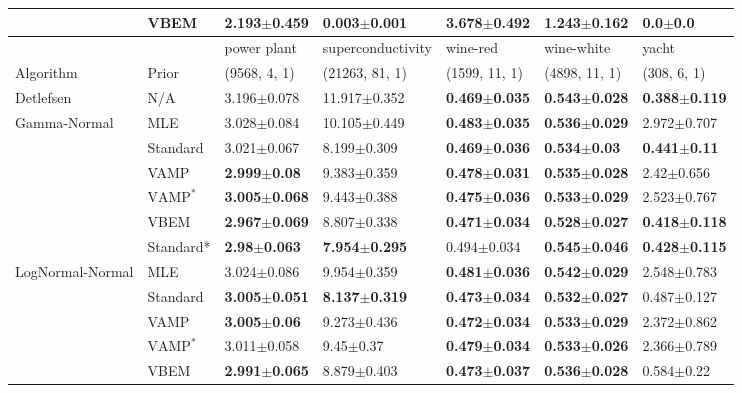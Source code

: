 \begin{tabular}{lllllll}
                 & VBEM &  \textbf{2.193$\pm$0.459} &  \textbf{0.003$\pm$0.001} &           3.678$\pm$0.492 &           1.243$\pm$0.162 &           0.0$\pm$0.0 \\
\midrule
                 &      &               power plant &         superconductivity &                  wine-red &                wine-white &                     yacht \\
Algorithm & Prior& (9568, 4, 1)& (21263, 81, 1)& (1599, 11, 1)& (4898, 11, 1)& (308, 6, 1)\\
\midrule
Detlefsen & N/A &           3.196$\pm$0.078 &          11.917$\pm$0.352 &  \textbf{0.469$\pm$0.035} &  \textbf{0.543$\pm$0.028} &  \textbf{0.388$\pm$0.119} \\
Gamma-Normal & MLE &           3.028$\pm$0.084 &          10.105$\pm$0.449 &  \textbf{0.483$\pm$0.035} &  \textbf{0.536$\pm$0.029} &           2.972$\pm$0.707 \\
                 & Standard &           3.021$\pm$0.067 &           8.199$\pm$0.309 &  \textbf{0.469$\pm$0.036} &   \textbf{0.534$\pm$0.03} &   \textbf{0.441$\pm$0.11} \\
                 & VAMP &   \textbf{2.999$\pm$0.08} &           9.383$\pm$0.359 &  \textbf{0.478$\pm$0.031} &  \textbf{0.535$\pm$0.028} &            2.42$\pm$0.656 \\
                 & $\text{VAMP}^*$ &  \textbf{3.005$\pm$0.068} &           9.443$\pm$0.388 &  \textbf{0.475$\pm$0.036} &  \textbf{0.533$\pm$0.029} &           2.523$\pm$0.767 \\
                 & VBEM &  \textbf{2.967$\pm$0.069} &           8.807$\pm$0.338 &  \textbf{0.471$\pm$0.034} &  \textbf{0.528$\pm$0.027} &  \textbf{0.418$\pm$0.118} \\
                 & Standard* &   \textbf{2.98$\pm$0.063} &  \textbf{7.954$\pm$0.295} &           0.494$\pm$0.034 &  \textbf{0.545$\pm$0.046} &  \textbf{0.428$\pm$0.115} \\
LogNormal-Normal & MLE &           3.024$\pm$0.086 &           9.954$\pm$0.359 &  \textbf{0.481$\pm$0.036} &  \textbf{0.542$\pm$0.029} &           2.548$\pm$0.783 \\
                 & Standard &  \textbf{3.005$\pm$0.051} &  \textbf{8.137$\pm$0.319} &  \textbf{0.473$\pm$0.034} &  \textbf{0.532$\pm$0.027} &           0.487$\pm$0.127 \\
                 & VAMP &   \textbf{3.005$\pm$0.06} &           9.273$\pm$0.436 &  \textbf{0.472$\pm$0.034} &  \textbf{0.533$\pm$0.029} &           2.372$\pm$0.862 \\
                 & $\text{VAMP}^*$ &           3.011$\pm$0.058 &             9.45$\pm$0.37 &  \textbf{0.479$\pm$0.034} &  \textbf{0.533$\pm$0.026} &           2.366$\pm$0.789 \\
                 & VBEM &  \textbf{2.991$\pm$0.065} &           8.879$\pm$0.403 &  \textbf{0.473$\pm$0.037} &  \textbf{0.536$\pm$0.028} &            0.584$\pm$0.22 \\
\bottomrule
\end{tabular}


